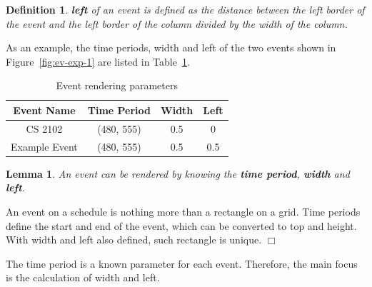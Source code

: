 \documentclass[12pt]{article}
\newtheorem{definition}{Definition}
\newtheorem{lemma}{Lemma}
\newenvironment{proof}{\par\noindent{\it Proof.}\hspace*{1em}}{$\Box$\bigskip}
\begin{document}
\begin{definition}
    \textbf{left} of an event is defined as the distance between the left border of the event and the left border of the column divided by the width of the column.
\end{definition}

As an example, the time periods, width and left of the two events shown in Figure~\ref{fig:ev-exp-1} are listed in Table~\ref{tab:ev-param}.
\begin{table}[H]
    \centering
    \caption{Event rendering parameters}\label{tab:ev-param}
    \begin{tabular}{cccc}
        \toprule
        Event Name & Time Period & Width & Left \\
        \midrule
        CS 2102 & (480, 555) & 0.5 & 0 \\
        Example Event & (480, 555) & 0.5 & 0.5 \\
        \bottomrule
    \end{tabular}
\end{table}

\begin{lemma}
    An event can be rendered by knowing the \textbf{time period}, \textbf{width} and \textbf{left}.
\end{lemma}
\begin{proof}
    An event on a schedule is nothing more than a rectangle on a grid. Time periods define the start and end of the event, which can be converted to top and height. With width and left also defined, such rectangle is unique.
\end{proof}

The time period is a known parameter for each event. Therefore, the main focus is the calculation of width and left.
\end{document}
